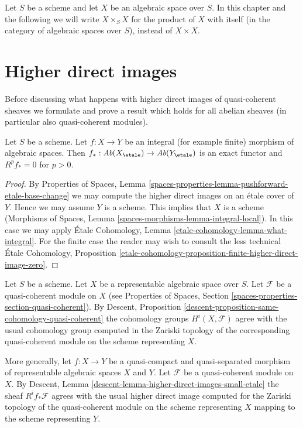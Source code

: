 \medskip\noindent
Let $S$ be a scheme and let $X$ be an algebraic space over $S$.
In this chapter and the following we will write $X \times_S X$
for the product of $X$ with itself (in the category of algebraic
spaces over $S$), instead of $X \times X$.








\section{Higher direct images}
\label{section-higher-direct-image}

\noindent
Before discussing what happens with higher direct images of quasi-coherent
sheaves we formulate and prove a result which holds for all abelian sheaves
(in particular also quasi-coherent modules).

\begin{lemma}
\label{lemma-finite-higher-direct-image-zero}
Let $S$ be a scheme. Let $f : X \to Y$ be an integral (for example finite)
morphism of algebraic spaces. Then
$f_* : \textit{Ab}(X_\etale) \to \textit{Ab}(Y_\etale)$
is an exact functor and $R^pf_* = 0$ for $p > 0$.
\end{lemma}

\begin{proof}
By Properties of Spaces, Lemma
\ref{spaces-properties-lemma-pushforward-etale-base-change}
we may compute the higher direct images on an \'etale cover of $Y$.
Hence we may assume $Y$ is a scheme. This implies that
$X$ is a scheme (Morphisms of Spaces, Lemma
\ref{spaces-morphisms-lemma-integral-local}).
In this case we may apply
\'Etale Cohomology, Lemma \ref{etale-cohomology-lemma-what-integral}.
For the finite case the reader may wish to consult the less technical
\'Etale Cohomology, Proposition
\ref{etale-cohomology-proposition-finite-higher-direct-image-zero}.
\end{proof}

\noindent
Let $S$ be a scheme. Let $X$ be a representable algebraic space over $S$.
Let $\mathcal{F}$ be a quasi-coherent module on $X$ (see
Properties of Spaces, Section \ref{spaces-properties-section-quasi-coherent}).
By
Descent, Proposition \ref{descent-proposition-same-cohomology-quasi-coherent}
the cohomology groups $H^i(X, \mathcal{F})$ agree with the usual
cohomology group computed in the Zariski topology of the corresponding
quasi-coherent module on the scheme representing $X$.

\medskip\noindent
More generally, let $f : X \to Y$ be a quasi-compact and quasi-separated
morphism of representable algebraic spaces $X$ and $Y$. Let
$\mathcal{F}$ be a quasi-coherent module on $X$. By
Descent, Lemma \ref{descent-lemma-higher-direct-images-small-etale}
the sheaf $R^if_*\mathcal{F}$ agrees with the
usual higher direct image computed for the Zariski topology
of the quasi-coherent module on the scheme representing $X$
mapping to the scheme representing $Y$.

